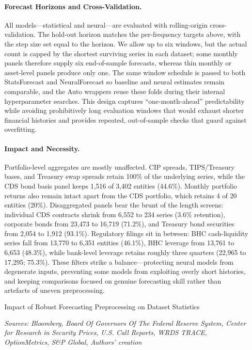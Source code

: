\documentclass{article}
\begin{document}
\paragraph{Forecast Horizons and Cross-Validation.} All models—statistical and neural—are evaluated with rolling-origin cross-validation. The hold-out horizon matches the per-frequency targets above, with the step size set equal to the horizon. We allow up to six windows, but the actual count is capped by the shortest surviving series in each dataset; some monthly panels therefore supply six end-of-sample forecasts, whereas thin monthly or asset-level panels produce only one. The same window schedule is passed to both StatsForecast and NeuralForecast so baseline and neural estimates remain comparable, and the Auto wrappers reuse these folds during their internal hyperparameter searches. This design captures “one-month-ahead” predictability while avoiding prohibitively long evaluation windows that would exhaust shorter financial histories and provides repeated, out-of-sample checks that guard against overfitting.

\paragraph{Impact and Necessity.} Portfolio-level aggregates are mostly unaffected. CIP spreads, TIPS/Treasury bases, and Treasury swap spreads retain 100\% of the underlying series, while the CDS bond basis panel keeps 1,516 of 3,402 entities (44.6\%). Monthly portfolio returns also remain intact apart from the CDS portfolio, which retains 4 of 20 entities (20\%). Disaggregated panels bear the brunt of the length screens: individual CDS contracts shrink from 6,552 to 234 series (3.6\% retention), corporate bonds from 23,473 to 16,719 (71.2\%), and Treasury bond securities from 2,054 to 1,912 (93.1\%). Regulatory filings sit in between: BHC cash-liquidity series fall from 13,770 to 6,351 entities (46.1\%), BHC leverage from 13,761 to 6,653 (48.3\%), while bank-level leverage retains roughly three quarters (22,965 to 17,295; 75.3\%). These filters strike a balance—protecting neural models from degenerate inputs, preventing some models from exploiting overly short histories, and keeping comparisons focused on genuine forecasting skill rather than artefacts of uneven preprocessing.

\begin{table}[htbp]
\centering
\caption{Impact of Robust Forecasting Preprocessing on Dataset Statistics}
\label{tab:filtered_dataset_stats}

\caption*{\scriptsize \emph{Sources: Bloomberg, Board Of Governors Of The Federal Reserve System, Center for Research in Security Prices, U.S. Call Reports, WRDS TRACE, OptionMetrics, S\&P Global, Authors' creation}}
\end{table}
\end{document}
